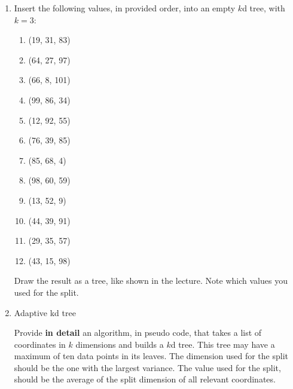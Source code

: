 \begin{enumerate}
\item
  Insert the following values, in provided order, into an empty $k$d tree, with $k=3$:

  \begin{minipage}{0.48\textwidth}
    \begin{enumerate}[label={\color{gray}\arabic*.}]
      \item (19, 31, 83)
      \item (64, 27, 97)
      \item (66, 8, 101)
      \item (99, 86, 34)
      \item (12, 92, 55)
      \item (76, 39, 85)
    \end{enumerate}
  \end{minipage}
  \begin{minipage}{0.48\textwidth}
    \begin{enumerate}[label={\color{gray}\arabic*.}]
      \setcounter{enumii}{6}
      \item (85, 68, 4)
      \item (98, 60, 59)
      \item (13, 52, 9)
      \item (44, 39, 91)
      \item (29, 35, 57)
      \item (43, 15, 98)
    \end{enumerate}
  \end{minipage}

  Draw the result as a tree, like shown in the lecture.
  Note which values you used for the split.

\item
Adaptive kd tree

Provide \textbf{in detail} an algorithm, in pseudo code, that takes a list of coordinates in $k$ dimensions and builds a $k$d tree.
This tree may have a maximum of ten data points in its leaves.
The dimension used for the split should be the one with the largest variance.
The value used for the split, should be the average of the split dimension of all relevant coordinates.

\end{enumerate}


